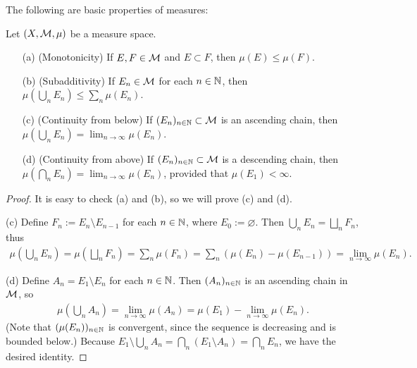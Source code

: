 The following are basic properties of measures:
\begin{prop}\label{properties of measures}
    Let $(X, {\mathcal{M}}, \mu)$ be a measure space.
    \begin{enumerate}
        \item[(a)]
        {
            (Monotonicity) If $E, F\in{\mathcal{M}}$ and $E\subset F$, then $\mu(E)\leq\mu(F)$.
        }
        \item[(b)]
        {
            (Subadditivity) If $E_n\in{\mathcal{M}}$ for each $n\in{\mathbb{N}}$, then $\mu\left(\bigcup_n E_n\right)\leq\sum_n\mu(E_n)$.
        }
        \item[(c)]
        {
            (Continuity from below) If $(E_n)_{n\in{\mathbb{N}}}\subset{\mathcal{M}}$ is an ascending chain, then $\mu\left(\bigcup_n E_n\right)=\lim_{n\rightarrow\infty}\mu(E_n)$.
        }
        \item[(d)]
        {
            (Continuity from above) If $(E_n)_{n\in{\mathbb{N}}}\subset{\mathcal{M}}$ is a descending chain, then $\mu\left(\bigcap_n E_n\right)=\lim_{n\rightarrow\infty}\mu(E_n)$, provided that $\mu(E_1)<\infty$.
        }
    \end{enumerate}
\end{prop}
\begin{proof}
    It is easy to check (a) and (b), so we will prove (c) and (d).

    \hangindent=0.65cm
    \noindent(c)
    Define $F_n:=E_n\setminus E_{n-1}$ for each $n\in{\mathbb{N}}$, where $E_0:=\varnothing$.
    Then $\bigcup_n E_n=\bigsqcup_n F_n$, thus 
    \begin{align*}
        \mu\left(\bigcup_n E_n\right)=\mu\left(\bigsqcup_n F_n\right)=\sum_n\mu(F_n)=\sum_n(\mu(E_n)-\mu(E_{n-1}))=\lim_{n\rightarrow\infty}\mu(E_n).
    \end{align*}

    \noindent(d)
    Define $A_n=E_1\setminus E_n$ for each $n\in{\mathbb{N}}$.
    Then $(A_n)_{n\in{\mathbb{N}}}$ is an ascending chain in ${\mathcal{M}}$, so
    \begin{align*}
        \mu\left(\bigcup_n A_n\right)=\lim_{n\rightarrow\infty}\mu(A_n)=\mu(E_1)-\lim_{n\rightarrow\infty}\mu(E_n).
    \end{align*}
    (Note that $(\mu(E_n))_{n\in{\mathbb{N}}}$ is convergent, since the sequence is decreasing and is bounded below.)
    Because $E_1\setminus\bigcup_n A_n=\bigcap_n(E_1\setminus A_n)=\bigcap_n E_n$, we have the desired identity.
\end{proof}

